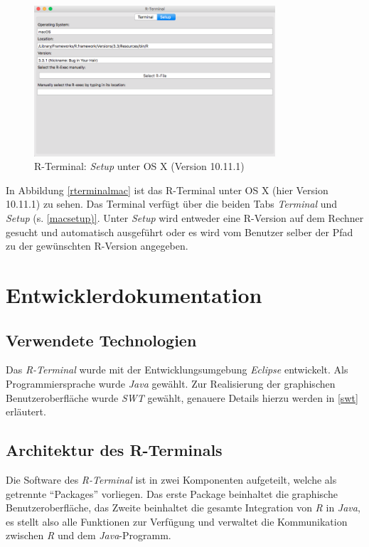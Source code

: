 \documentclass[a4paper, 12pt]{report} %
\begin{document}
\begin{figure}[htpb]
\centering
\includegraphics[width=0.8\textwidth]{rterminalsetup}
\caption{R-Terminal: \textit{Setup} unter OS X (Version 10.11.1)}
\label{macsetup}
\end{figure}

In Abbildung \ref{rterminalmac} ist das R-Terminal unter OS X (hier Version 10.11.1) zu sehen. Das Terminal verfügt über die beiden Tabs \textit{Terminal} und \textit{Setup} (s. \ref{macsetup)}. Unter \textit{Setup} wird entweder eine R-Version auf dem Rechner gesucht und automatisch ausgeführt oder es wird vom Benutzer selber der Pfad zu der gewünschten R-Version angegeben.

\newpage

\chapter{Entwicklerdokumentation}

\section{Verwendete Technologien}

Das \textit{R-Terminal} wurde mit der Entwicklungsumgebung \textit{Eclipse} entwickelt.
Als Programmiersprache wurde \textit{Java} gewählt. Zur Realisierung der graphischen Benutzeroberfläche wurde \textit{SWT} gewählt, genauere Details hierzu werden in \ref{swt} erläutert.



\section{Architektur des R-Terminals}

Die Software des \textit{R-Terminal} ist in zwei Komponenten aufgeteilt, welche als getrennte "`Packages"' vorliegen. Das erste Package beinhaltet die graphische Benutzeroberfläche, das Zweite beinhaltet die gesamte Integration von \textit{R} in \textit{Java}, es stellt also alle Funktionen zur Verfügung und verwaltet die Kommunikation zwischen \textit{R} und dem \textit{Java}-Programm.
\end{document}
